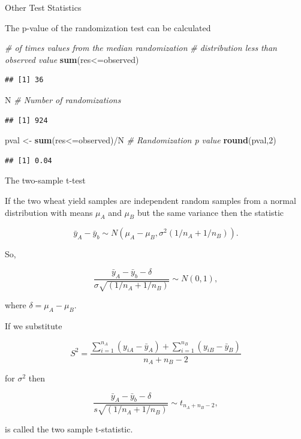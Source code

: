 \documentclass[9pt,ignorenonframetext,]{beamer}
\newenvironment{Shaded}{\begin{snugshade}}{\end{snugshade}}
\newcommand{\KeywordTok}[1]{\textcolor[rgb]{0.13,0.29,0.53}{\textbf{{#1}}}}
\newcommand{\DecValTok}[1]{\textcolor[rgb]{0.00,0.00,0.81}{{#1}}}
\newcommand{\StringTok}[1]{\textcolor[rgb]{0.31,0.60,0.02}{{#1}}}
\newcommand{\CommentTok}[1]{\textcolor[rgb]{0.56,0.35,0.01}{\textit{{#1}}}}
\newcommand{\NormalTok}[1]{{#1}}
\begin{document}
\begin{frame}[fragile]{Other Test Statistics}

The p-value of the randomization test can be calculated

\begin{Shaded}
\begin{Highlighting}[]
\CommentTok{# of times values from the median randomization }
\CommentTok{# distribution less than observed value}
\KeywordTok{sum}\NormalTok{(res<=observed) }
\end{Highlighting}
\end{Shaded}

\begin{verbatim}
## [1] 36
\end{verbatim}

\begin{Shaded}
\begin{Highlighting}[]
\NormalTok{N }\CommentTok{# Number of randomizations}
\end{Highlighting}
\end{Shaded}

\begin{verbatim}
## [1] 924
\end{verbatim}

\begin{Shaded}
\begin{Highlighting}[]
\NormalTok{pval <-}\StringTok{ }\KeywordTok{sum}\NormalTok{(res<=observed)/N }\CommentTok{# Randomization p value}
\KeywordTok{round}\NormalTok{(pval,}\DecValTok{2}\NormalTok{)}
\end{Highlighting}
\end{Shaded}

\begin{verbatim}
## [1] 0.04
\end{verbatim}

\end{frame}

\begin{frame}{The two-sample t-test}

If the two wheat yield samples are independent random samples from a
normal distribution with means \(\mu_A\) and \(\mu_B\) but the same
variance then the statistic

\[ {\bar y}_A - {\bar y}_b \sim N\left(\mu_A-\mu_B,\sigma^2(1/n_A+1/n_B) \right).\]

So,

\[ \frac {{\bar y}_A - {\bar y}_b- \delta}{\sigma \sqrt{(1/n_A+1/n_B)}} \sim N(0,1),\]

where \(\delta=\mu_A-\mu_B\).

If we substitute

\[S^2=\frac{\sum_{i=1}^{n_A}(y_{iA}-{\bar y}_A)+\sum_{i=1}^{n_B}(y_{iB}-{\bar y}_B)}{n_A+n_B-2}\]

for \(\sigma^2\) then

\[ \frac {{\bar y}_A - {\bar y}_b - \delta}{s \sqrt{(1/n_A+1/n_B)}} \sim t_{n_A+n_B-2},\]

is called the two sample t-statistic.

\end{frame}
\end{document}
